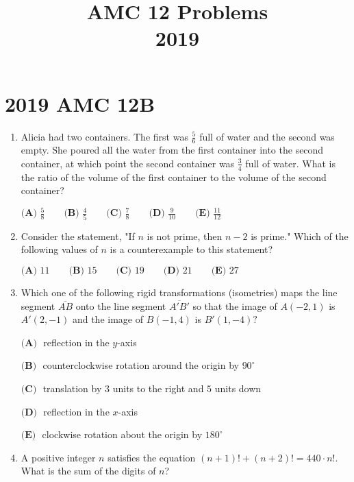 \documentclass{article}
\title{AMC 12 Problems \\ 2019}
\date{}
\begin{document}
\maketitle\thispagestyle{fancy}\newpage\section*{2019 AMC 12B}\begin{enumerate}[label=\arabic*., itemsep=0.5em]\item Alicia had two containers. The first was \(\tfrac{5}{6}\) full of water and the second was empty. She poured all the water from the first container into the second container, at which point the second container was \(\tfrac{3}{4}\) full of water. What is the ratio of the volume of the first container to the volume of the second container?

\(\textbf{(A) } \frac{5}{8} \qquad \textbf{(B) } \frac{4}{5} \qquad \textbf{(C) } \frac{7}{8} \qquad \textbf{(D) } \frac{9}{10} \qquad \textbf{(E) } \frac{11}{12}\)\par \vspace{0.5em}\item Consider the statement, "If \(n\) is not prime, then \(n-2\) is prime." Which of the following values of \(n\) is a counterexample to this statement?

\(\textbf{(A) } 11 \qquad \textbf{(B) } 15 \qquad \textbf{(C) } 19 \qquad \textbf{(D) } 21 \qquad \textbf{(E) } 27\)\par \vspace{0.5em}\item Which one of the following rigid transformations (isometries) maps the line segment \(\overline{AB}\) onto the line segment \(\overline{A'B'}\) so that the image of \(A(-2,1)\) is \(A'(2,-1)\) and the image of \(B(-1,4)\) is \(B'(1,-4)?\)

\(\textbf{(A) } \) reflection in the \(y\)-axis

\(\textbf{(B) } \) counterclockwise rotation around the origin by \(90^{\circ}\)

\(\textbf{(C) } \) translation by \(3\) units to the right and \(5\) units down

\(\textbf{(D) } \) reflection in the \(x\)-axis

\(\textbf{(E) } \) clockwise rotation about the origin by \(180^{\circ}\)\par \vspace{0.5em}\item A positive integer \(n\) satisfies the equation \((n+1)!+(n+2)!=440\cdot n!\). What is the sum of the digits of \(n\)?


\end{enumerate}
\end{document}
